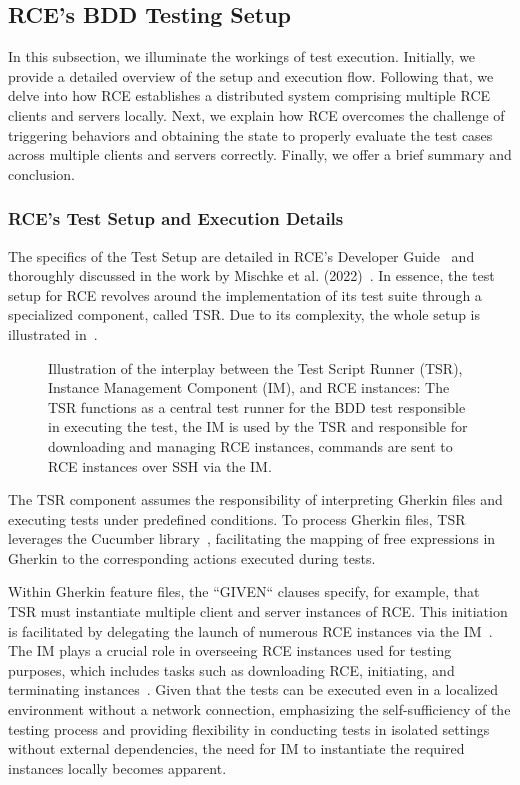 \subsection{\ac{RCE}'s BDD Testing Setup}
\label{subsec:BuiltinBDDTest}
In this subsection, we illuminate the workings of test execution. Initially, we provide a detailed overview of the setup and execution flow. Following that, we delve into how \ac{RCE} establishes a distributed system comprising multiple \ac{RCE} clients and servers locally. Next, we explain how \ac{RCE} overcomes the challenge of triggering behaviors and obtaining the state to properly evaluate the test cases across multiple clients and servers correctly. Finally, we offer a brief summary and conclusion.

\subsubsection{\ac{RCE}'s Test Setup and Execution Details}
The specifics of the Test Setup are detailed in \ac{RCE}'s Developer Guide~\cite{rceDevGuide10x} and thoroughly discussed in the work by Mischke et al. (2022)~\cite{10.1007/978-3-031-08760-8_44}. In essence, the test setup for \ac{RCE} revolves around the implementation of its test suite through a specialized component, called \acf{TSR}.
Due to its complexity, the whole setup is illustrated in~.

\begin{figure}[h]
    \centering
    
    \caption{Illustration of the interplay between the Test Script Runner (TSR), Instance Management Component (IM), and RCE instances: The TSR functions as a central test runner for the BDD test responsible in executing the test, the IM is used by the TSR and responsible for downloading and managing RCE instances, commands are sent to RCE instances over SSH via the IM.}
    \label{fig:rce-setup}
\end{figure}

The \ac{TSR} component assumes the responsibility of interpreting Gherkin files and executing tests under predefined conditions. To process Gherkin files, \ac{TSR} leverages the Cucumber library~\cite{10.1007/978-3-031-08760-8_44}, facilitating the mapping of free expressions in Gherkin to the corresponding actions executed during tests.

Within Gherkin feature files, the ``GIVEN`` clauses specify, for example, that \ac{TSR} must instantiate multiple client and server instances of \ac{RCE}. This initiation is facilitated by delegating the launch of numerous \ac{RCE} instances via the \acf{IM}~\cite{rceDevGuide10x}. 
The \ac{IM} plays a crucial role in overseeing \ac{RCE} instances used for testing purposes, which includes tasks such as downloading \ac{RCE}, initiating, and terminating instances~\cite{10.1007/978-3-031-08760-8_44,rceDevGuide10x}. Given that the tests can be executed even in a localized environment without a network connection, emphasizing the self-sufficiency of the testing process and providing flexibility in conducting tests in isolated settings without external dependencies, the need for \ac{IM} to instantiate the required instances locally becomes apparent.

